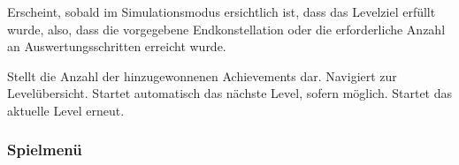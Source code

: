 \begin{center}
\setlength\fboxsep{20pt}
\setlength\fboxrule{1pt}
\end{center}

Erscheint, sobald im Simulationsmodus ersichtlich ist, dass das Levelziel erfüllt wurde, also, dass die vorgegebene Endkonstellation oder die erforderliche Anzahl an Auswertungsschritten erreicht wurde.
\begin{requirements}
 Stellt die Anzahl der hinzugewonnenen Achievements dar.
 Navigiert zur Levelübersicht.
 Startet automatisch das nächste Level, sofern möglich.
 Startet das aktuelle Level erneut.
\end{requirements}

\subsubsection{Spielmenü}

\begin{center}
\setlength\fboxsep{20pt}
\setlength\fboxrule{1pt}
\end{center}

